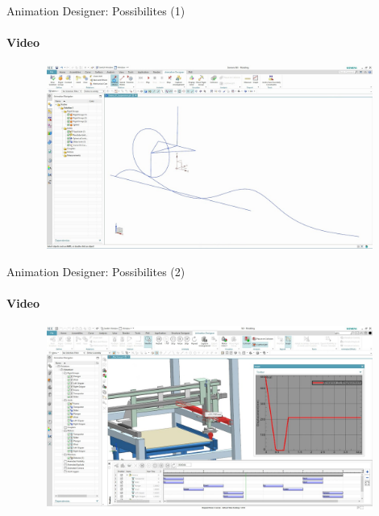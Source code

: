 \documentclass[aspectratio=169]{beamer}
\begin{document}
\begin{frame}[t]{Animation Designer: Possibilites (1)}
    \framesubtitle{Video}
    \vspace{-0.6cm}
    \begin{figure}[H]
        \href{https://youtu.be/UKjR2YiDg2I}{
            \centering\includegraphics[height=6cm,width=1\textwidth,keepaspectratio]{anim_video1_preview.jpg}}
        \label{fig:anim_video1_preview.jpg}
    \end{figure}
\end{frame}

\begin{frame}[t]{Animation Designer: Possibilites (2)}
    \framesubtitle{Video}
    \vspace{-0.6cm}
    \begin{figure}[H]
        \href{https://youtu.be/mlrptDMu42o}{
            \centering\includegraphics[height=6cm,width=1\textwidth,keepaspectratio]{anim_video2_preview.jpg}}
        \label{fig:anim_video2_preview.jpg}
    \end{figure}
\end{frame}
\end{document}
